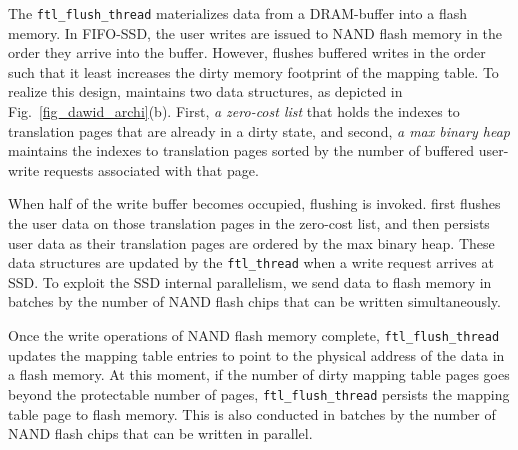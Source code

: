 The \texttt{ftl\_flush\_thread} materializes data from a DRAM-buffer
into a flash memory.  In FIFO-SSD, the user writes are issued
to NAND flash memory in the order they arrive into the buffer. However, \ours{}
flushes buffered writes in the order such that it least increases the dirty memory
footprint of the mapping table.  To realize this design, \ours{} maintains two
data structures, as depicted in Fig.~\ref{fig_dawid_archi}(b). First, \textit{a
zero-cost list} that holds the indexes to translation pages that are already
in a dirty state, and second, \textit{a max binary heap}
maintains the indexes to translation pages sorted by the number of buffered
user-write requests associated with that page.  

When half of the write buffer becomes occupied, flushing is invoked. \ours{}
first flushes the user data on those translation pages in the zero-cost list, and then
persists user data as their translation pages are ordered by the max binary
heap. 
These data structures are updated by the \texttt{ftl\_thread} 
when a write request arrives at SSD. 
To exploit the SSD internal parallelism, we send data to flash memory in
batches by the number of NAND flash chips that can be written simultaneously.

Once the write operations of NAND flash memory complete,
\texttt{ftl\_flush\_thread} updates the mapping table entries to point to the
physical address of the data in a flash memory.  At this moment, if the number
of dirty mapping table pages goes beyond the protectable number of pages,
\texttt{ftl\_flush\_thread} persists the mapping table page to flash memory.
This is also conducted in batches by the number of NAND flash chips that can be
written in parallel.
